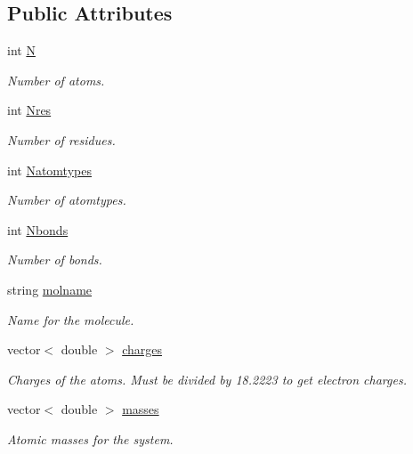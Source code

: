 \subsection*{Public Attributes}
\begin{DoxyCompactItemize}
\item 
int \hyperlink{classMol2_a7fcd40f8ea09f926d94e8394afb4751b}{N}
\begin{DoxyCompactList}\small\item\em Number of atoms. \end{DoxyCompactList}\item 
int \hyperlink{classMol2_a1cc7fff66596ea277d2ff447082b8808}{Nres}
\begin{DoxyCompactList}\small\item\em Number of residues. \end{DoxyCompactList}\item 
int \hyperlink{classMol2_abec1d304ce65117eafb1bfc03bd37cae}{Natomtypes}
\begin{DoxyCompactList}\small\item\em Number of atomtypes. \end{DoxyCompactList}\item 
int \hyperlink{classMol2_a2c0dbb3b4214d3f462882f21ac0827d5}{Nbonds}
\begin{DoxyCompactList}\small\item\em Number of bonds. \end{DoxyCompactList}\item 
string \hyperlink{classMol2_a55113887837f3028146348ff6a0cc1b4}{molname}
\begin{DoxyCompactList}\small\item\em Name for the molecule. \end{DoxyCompactList}\item 
vector$<$ double $>$ \hyperlink{classMol2_a85429e831336c4f3044b6cc879a8b656}{charges}
\begin{DoxyCompactList}\small\item\em Charges of the atoms. Must be divided by 18.2223 to get electron charges. \end{DoxyCompactList}\item 
vector$<$ double $>$ \hyperlink{classMol2_a74b5089ad2715395ee10b9fd88bff5cb}{masses}
\begin{DoxyCompactList}\small\item\em Atomic masses for the system. \end{DoxyCompactList}\item 

\end{DoxyCompactItemize}
